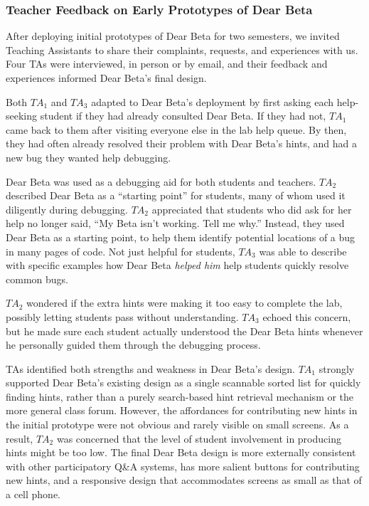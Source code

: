 \subsubsection{Teacher Feedback on Early Prototypes of Dear Beta}


After deploying initial prototypes of Dear Beta for two semesters, we invited Teaching Assistants to share their complaints, requests, and experiences with us. Four TAs were interviewed, in person or by email, and their feedback and experiences informed Dear Beta's final design.

Both $TA_{1}$ and $TA_{3}$ adapted to Dear Beta's deployment by first asking each help-seeking student if they had already consulted Dear Beta. If they had not, $TA_{1}$ came back to them after visiting everyone else in the lab help queue. By then, they had often already resolved their problem with Dear Beta's hints, and had a new bug they wanted help debugging. 

Dear Beta was used as a debugging aid for both students and teachers. $TA_{2}$ described Dear Beta as a ``starting point'' for students, many of whom used it diligently during debugging. $TA_{2}$ appreciated that students who did ask for her help no longer said, ``My Beta isn't working. Tell me why.'' Instead, they used Dear Beta as a starting point, to help them identify potential locations of a bug in many pages of code. Not just helpful for students, $TA_{3}$ was able to describe with specific examples how Dear Beta \textit{helped him} help students quickly resolve common bugs.

$TA_{2}$ wondered if the extra hints were making it too easy to complete the lab, possibly letting students pass without understanding. $TA_{3}$ echoed this concern, but he made sure each student actually understood the Dear Beta hints whenever he personally guided them through the debugging process.

TAs identified both strengths and weakness in Dear Beta's design. $TA_{1}$ strongly supported Dear Beta's existing design as a single scannable sorted list for quickly finding hints, rather than a purely search-based hint retrieval mechanism or the more general class forum. However, the affordances for contributing new hints in the initial prototype were not obvious and rarely visible on small screens. As a result, $TA_{2}$ was concerned that the level of student involvement in producing hints might be too low. The final Dear Beta design is more externally consistent with other participatory Q\&A systems, has more salient buttons for contributing new hints, and a responsive design that accommodates screens as small as that of a cell phone. 

